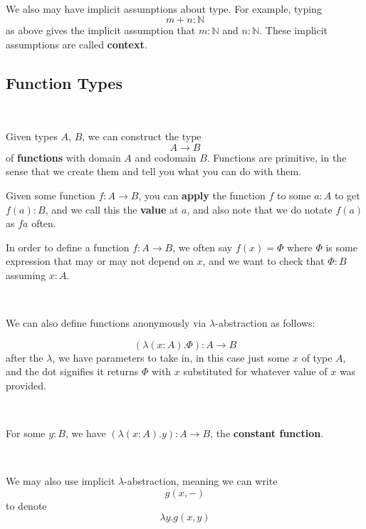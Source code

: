\documentclass{article}
\begin{document}
\begin{definition}[Context]
\

We also may have implicit assumptions about type. For example, typing $$m+n: \mathbb{N}$$as above gives the implicit assumption that $m: \mathbb{N}$ and $n: \mathbb{N}$. These implicit assumptions are called \textbf{context}. 
\end{definition}

\subsection{Function Types}

\begin{definition}
\

Given types $A$, $B$, we can construct the type $$A \to B$$of \textbf{functions} with domain $A$ and codomain $B$. Functions are primitive, in the sense that we create them and tell you what you can do with them. 

Given some function $f: A \to B$, you can \textbf{apply} the function $f$ to some $a : A$ to get $f(a) : B$, and we call this the \textbf{value} at $a$, and also note that we do notate $f(a)$ as $f a$ often.   

In order to define a function $f: A \to B$, we often say $f(x) = \Phi$ where $\Phi$ is some expression that may or may not depend on $x$, and we want to check that $\Phi: B$ assuming $x: A$.
\end{definition}

\begin{definition}
\

We can also define functions anonymously via $\lambda$-abstraction as follows:

$$(\lambda(x:A). \Phi): A \to B$$after the $\lambda$, we have parameters to take in, in this case just some $x$ of type $A$, and the dot signifies it returns $\Phi$ with $x$ substituted for whatever value of $x$ was provided. 
\end{definition}

\begin{example}
\

For some $y :B$, we have $(\lambda(x:A).y): A\to B$, the \textbf{constant function}. 
\end{example}

\begin{example}
\

We may also use implicit $\lambda$-abstraction, meaning we can write $$g(x,-)$$to denote $$\lambda y. g(x,y)$$
\end{example}
\end{document}
